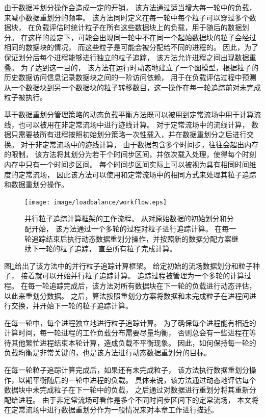 由于数据冲划分操作会造成一定的开销，
该方法通过适当增大每一轮中的负载，来减小数据重划分的频率。
该方法同时定义在每一轮中每个粒子可以穿过多个数据块，
在负载评估时统计粒子在所有这些数据块上的负载，用于随后的数据划分。
在这样的设定下，可能会出现同一轮中不在同一个起始数据块的粒子会经过相同的数据块的情况，
而这些粒子是可能会被分配给不同的进程的。
因此，为了保证划分后每个进程能够进行独立的粒子追踪，
该方法允许进程之间出现数据重叠。
为了达到这一目的，
该方法在运行时动态地建立了一个图模型，根据粒子的历史数据访问信息记录数据块之间的一阶访问依赖，
用于在负载评估过程中预测从一个数据块到另一个数据块的粒子转移数目，这一操作在每一轮追踪前对未完成粒子被执行。

基于数据重划分管理策略的动态负载平衡方法既可以被用到定常流场中用于计算流线，也可以被用在非定常流场中进行迹线计算。
对于定常流场中的流线计算，
数据只需要被所有进程按照初始划分策略一次性载入，并在数据重划分之后进行交换。
对于非定常流场中的迹线计算，
由于数据包含多个时间步，往往会超出内存的限制，
该方法将其划分为若干个时间步区间，并依次载入处理，使得每个时刻内存中只有一个时间步区间。
每个时间步区间实际上可以被视为具有相同时间维度的定常流场，
因此该方法可以使用和定常流场中的相同方式来处理其粒子追踪和数据重划分操作。

\begin{figure}[H]
  \centering
  \texttt{[image: image/loadbalance/workflow.eps]}
  \caption{
    并行粒子追踪计算框架的工作流程。\parencite{ZhangGYP18}
    从对原始数据的初始划分和分配开始，
    该方法通过一个多轮的过程对粒子进行追踪计算。
    在每一轮追踪结束后执行动态数据重划分操作，并按照新的数据分配方案继续下一轮的粒子追踪，
    直至所有粒子完成计算。
 }
\label{fig:dynamicdr:workflow}
\end{figure}

图\ref{fig:dynamicdr:workflow}给出了该方法中的并行粒子追踪计算框架。
给定初始的流场数据划分和粒子种子，
接着就可以开始并行粒子追踪计算。
追踪过程被管理为一个多轮的计算过程。
在每一轮追踪完成后，该方法对所有数据块在下一轮的负载进行动态评估，以此来重划分数据。
之后，算法按照重划分方案将数据和未完成粒子在进程间进行交换，并开始下一轮的粒子追踪计算。

在每一轮中，每个进程独立地进行粒子追踪计算。
为了确保每个进程能有相近的计算时间，每一轮进程的工作负载分布需要尽量均衡，
否则总会有一些进程在等待其他繁忙进程结束本轮计算，造成负载不平衡现象。
因此，如何保持每一轮的负载均衡是非常关键的，也是该方法进行动态数据重划分的目标。 

在每一轮粒子追踪计算完成后，如果还有未完成粒子，
该方法执行数据重划分操作，以期平衡随后的一轮中进程的负载。
具体来说，该方法通过动态地评估每个数据块中未完成粒子在下一轮中的负载，
之后通过对数据进行重划分将其重新分配给进程。
由于非定常流场可看作是多个不同时间步区间下的定常流场，
本文将在定常流场中进行数据重划分作为一般情况来对本章工作进行描述。


